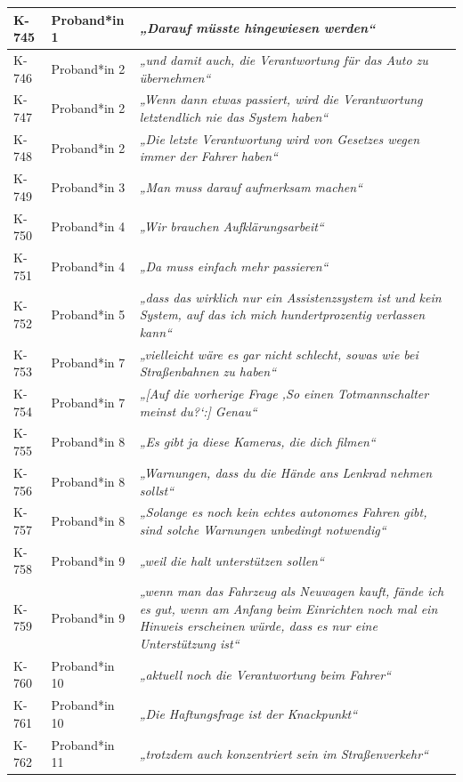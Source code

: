 {\begin{xltabular}{\textwidth}{
    |P{0.10\textwidth}
    |P{0.17\textwidth}
    |Y|
}
K-745 & Proband*in 1 & \textit{„Darauf müsste hingewiesen werden“} \\
\hline
K-746 & Proband*in 2 & \textit{„und damit auch, die Verantwortung für das Auto zu übernehmen“} \\
\hline
K-747 & Proband*in 2 & \textit{„Wenn dann etwas passiert, wird die Verantwortung letztendlich nie das System haben“} \\
\hline
K-748 & Proband*in 2 & \textit{„Die letzte Verantwortung wird von Gesetzes wegen immer der Fahrer haben“} \\
\hline
K-749 & Proband*in 3 & \textit{„Man muss darauf aufmerksam machen“} \\
\hline
K-750 & Proband*in 4 & \textit{„Wir brauchen Aufklärungsarbeit“} \\
\hline
K-751 & Proband*in 4 & \textit{„Da muss einfach mehr passieren“} \\
\hline
K-752 & Proband*in 5 & \textit{„dass das wirklich nur ein Assistenzsystem ist und kein System, auf das ich mich hundertprozentig verlassen kann“} \\
\hline
K-753 & Proband*in 7 & \textit{„vielleicht wäre es gar nicht schlecht, sowas wie bei Straßenbahnen zu haben“} \\
\hline
K-754 & Proband*in 7 & \textit{„[Auf die vorherige Frage ‚So einen Totmannschalter meinst du?‘:] Genau“} \\
\hline
K-755 & Proband*in 8 & \textit{„Es gibt ja diese Kameras, die dich filmen“} \\
\hline
K-756 & Proband*in 8 & \textit{„Warnungen, dass du die Hände ans Lenkrad nehmen sollst“} \\
\hline
K-757 & Proband*in 8 & \textit{„Solange es noch kein echtes autonomes Fahren gibt, sind solche Warnungen unbedingt notwendig“} \\
\hline
K-758 & Proband*in 9 & \textit{„weil die halt unterstützen sollen“} \\
\hline
K-759 & Proband*in 9 & \textit{„wenn man das Fahrzeug als Neuwagen kauft, fände ich es gut, wenn am Anfang beim Einrichten noch mal ein Hinweis erscheinen würde, dass es nur eine Unterstützung ist“} \\
\hline
K-760 & Proband*in 10 & \textit{„aktuell noch die Verantwortung beim Fahrer“} \\
\hline
K-761 & Proband*in 10 & \textit{„Die Haftungsfrage ist der Knackpunkt“} \\
\hline
K-762 & Proband*in 11 & \textit{„trotzdem auch konzentriert sein im Straßenverkehr“} \\

\end{xltabular}}
